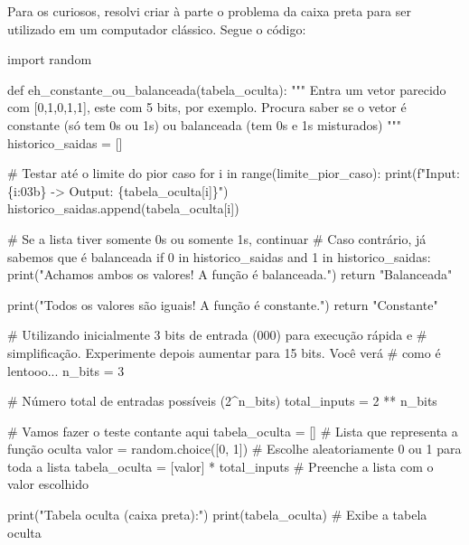 \documentclass[
  brazilian,
]{report}
\newenvironment{Shaded}{\begin{snugshade}}{\end{snugshade}}
\newcommand{\NormalTok}[1]{\textcolor[rgb]{0.00,0.23,0.31}{#1}}
\begin{document}
Para os curiosos, resolvi criar à parte o problema da caixa preta para
ser utilizado em um computador clássico. Segue o código:

\begin{Shaded}
\begin{Highlighting}[]


\NormalTok{import random}

\NormalTok{def eh\_constante\_ou\_balanceada(tabela\_oculta):}
\NormalTok{    """}
\NormalTok{    Entra um vetor parecido com [0,1,0,1,1], este com 5 bits, por exemplo.}
\NormalTok{    Procura saber se o vetor é constante (só tem 0s ou 1s) ou balanceada (tem 0s e 1s misturados)}
\NormalTok{    """}
\NormalTok{    historico\_saidas = []}
    
\NormalTok{    \# Testar até o limite do pior caso}
\NormalTok{    for i in range(limite\_pior\_caso):}
\NormalTok{        print(f"Input: \{i:03b\} {-}\textgreater{} Output: \{tabela\_oculta[i]\}")}
\NormalTok{        historico\_saidas.append(tabela\_oculta[i])}
        
\NormalTok{        \# Se a lista tiver somente 0s ou somente 1s, continuar}
\NormalTok{        \# Caso contrário, já sabemos que é balanceada}
\NormalTok{        if 0 in historico\_saidas and 1 in historico\_saidas:}
\NormalTok{            print("Achamos ambos os valores! A função é balanceada.")}
\NormalTok{            return "Balanceada"}
    
\NormalTok{    print("Todos os valores são iguais! A função é constante.")}
\NormalTok{    return "Constante"}

\NormalTok{\# Utilizando inicialmente 3 bits de entrada (000) para execução rápida e}
\NormalTok{\# simplificação. Experimente depois aumentar para 15 bits. Você verá }
\NormalTok{\# como é lentooo...}
\NormalTok{n\_bits = 3}

\NormalTok{\# Número total de entradas possíveis (2\^{}n\_bits)}
\NormalTok{total\_inputs = 2 ** n\_bits}

\NormalTok{\# Vamos fazer o teste contante aqui}
\NormalTok{tabela\_oculta = []                          \# Lista que representa a função oculta}
\NormalTok{valor = random.choice([0, 1])               \# Escolhe aleatoriamente 0 ou 1 para toda a lista}
\NormalTok{tabela\_oculta = [valor] * total\_inputs      \# Preenche a lista com o valor escolhido}

\NormalTok{print("Tabela oculta (caixa preta):")}
\NormalTok{print(tabela\_oculta)                        \# Exibe a tabela oculta}


\end{Highlighting}
\end{Shaded}
\end{document}
